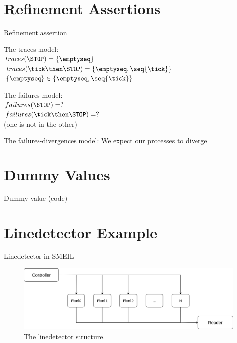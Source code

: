\documentclass[11pt]{beamer}
\begin{document}
%
\section{Refinement Assertions}
\begin{frame}{Refinement assertion}
    \begin{block}{}
     The traces model:  \\ $traces(\STOP) = \{\emptyseq\}$ \\
     $traces(\tick \then \STOP) = \{\emptyseq, \seq{\tick}\}$ \\
     $\{\emptyseq\} \in \{\emptyseq, \seq{\tick}\}$
    \end{block}

    \pause
    \begin{block}{}
     The failures model: \\ $failures(\STOP) = ?$ \\
     $failures(\tick \then \STOP) = ?$ \\
     (one is not in the other)
    \end{block}

    \pause
    \begin{block}{}
     The failures-divergences model: We expect our processes to diverge
    \end{block}
\end{frame}

\section{Dummy Values}
%
\begin{frame}{Dummy value}
(code)
\end{frame}

\section{Linedetector Example}
%
\begin{frame}{Linedetector in SMEIL}
     \begin{figure}[!ht]
          \centering
          \includegraphics[scale=0.25]{figures/Linedetector.png}
          \caption{The linedetector structure.}
     \end{figure}
\end{frame}
\end{document}
